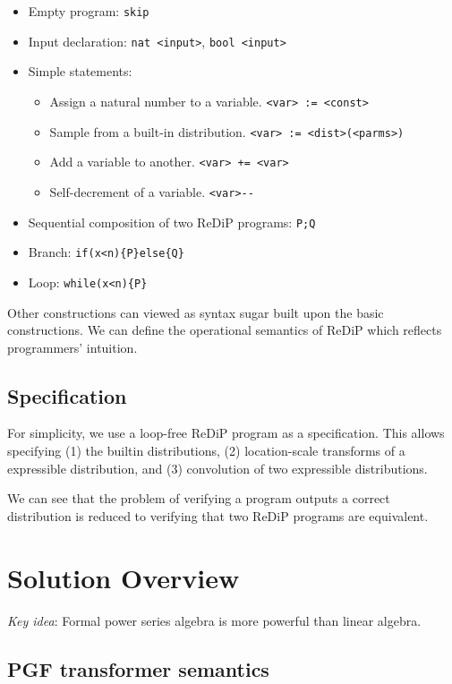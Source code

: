 \documentclass[a4paper]{article}
\begin{document}
\begin{itemize}
	\item Empty program: \texttt{skip}
	\item Input declaration: \texttt{nat <input>}, \texttt{bool <input>}
	\item Simple statements:
	      \begin{itemize}
		      \item Assign a natural number to a variable. \texttt{<var> := <const>}
		      \item Sample from a built-in distribution. \texttt{<var> := <dist>(<parms>)}
		      \item Add a variable to another. \texttt{<var> += <var>}
		      \item Self-decrement of a variable. \texttt{<var>{-}{-}}
	      \end{itemize}
	\item Sequential composition of two ReDiP programs: \texttt{P;Q}
	\item Branch: \texttt{if(x<n)\{P\}else\{Q\}}
	\item Loop: \texttt{while(x<n)\{P\}}
\end{itemize}

Other constructions can viewed as syntax sugar built upon the basic constructions.
We can define the operational semantics of ReDiP which reflects programmers' intuition.

\subsection{Specification}
For simplicity, we use a loop-free ReDiP program as a specification. This allows specifying (1) the builtin distributions, (2) location-scale transforms of a expressible distribution, and (3) convolution of two expressible distributions.\par
We can see that the problem of verifying a program outputs a correct distribution is reduced to verifying that two ReDiP programs are equivalent.

\section{Solution Overview}

\emph{Key idea}: Formal power series algebra is more powerful than linear algebra.

\subsection{PGF transformer semantics}
\end{document}
